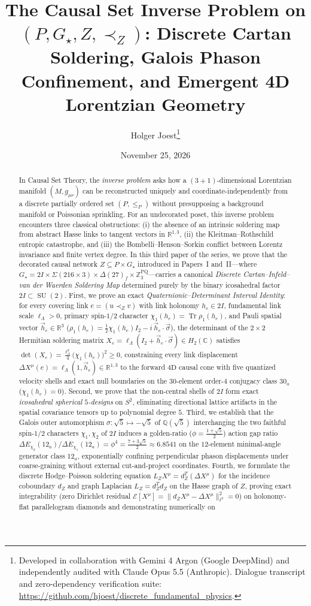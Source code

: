 \documentclass[11pt,a4paper]{article}
\title{\textbf{The Causal Set Inverse Problem on $(P, G_\star, Z, \prec_Z)$: Discrete Cartan Soldering, Galois Phason Confinement, and Emergent 4D Lorentzian Geometry}}
\author{Holger Joest\thanks{Developed in collaboration with Gemini 4 Argon (Google DeepMind) and independently audited with Claude Opus 5.5 (Anthropic). Dialogue transcript and zero-dependency verification suite: \url{https://github.com/hjoest/discrete_fundamental_physics}.}}
\date{November 25, 2026}
\theoremstyle{definition}
\theoremstyle{remark}
\newcommand{\R}{\mathbb{R}}
\newcommand{\C}{\mathbb{C}}
\newcommand{\Z}{\mathbb{Z}}
\newcommand{\Q}{\mathbb{Q}}
\newcommand{\Tr}{\operatorname{Tr}}
\newcommand{\SU}{\operatorname{SU}}
\newcommand{\Gstar}{G_\star}
\begin{document}
\maketitle

\begin{abstract}
In Causal Set Theory, the \emph{inverse problem} asks how a $(3+1)$-dimensional Lorentzian manifold $(M, g_{\mu\nu})$ can be reconstructed uniquely and coordinate-independently from a discrete partially ordered set $(P, \le_P)$ without presupposing a background manifold or Poissonian sprinkling. For an undecorated poset, this inverse problem encounters three classical obstructions: (i) the absence of an intrinsic soldering map from abstract Hasse links to tangent vectors in $\R^{1,3}$, (ii) the Kleitman--Rothschild entropic catastrophe, and (iii) the Bombelli--Henson--Sorkin conflict between Lorentz invariance and finite vertex degree. In this third paper of the series, we prove that the decorated causal network $Z \subseteq P \times \Gstar$ introduced in Papers~I and~II---where $\Gstar = 2I \times \Sigma(216 \times 3) \times \Delta(27)_f \times \Z_3^{\mathrm{PQ}}$---carries a canonical \emph{Discrete Cartan--Infeld--van der Waerden Soldering Map} determined purely by the binary icosahedral factor $2I \subset \SU(2)$. First, we prove an exact \emph{Quaternionic--Determinant Interval Identity}: for every covering link $e = (u \prec_Z v)$ with link holonomy $h_e \in 2I$, fundamental link scale $\ell_\Lambda > 0$, primary spin-$1/2$ character $\chi_1(h_e) = \Tr\rho_1(h_e)$, and Pauli spatial vector $\vec{h}_e \in \R^3$ ($\rho_1(h_e) = \frac{1}{2}\chi_1(h_e)I_2 - i\,\vec{h}_e\cdot\vec{\sigma}$), the determinant of the $2 \times 2$ Hermitian soldering matrix $X_e = \ell_\Lambda(I_2 + \vec{h}_e\cdot\vec{\sigma}) \in H_2(\C)$ satisfies $\det(X_e) = \frac{\ell_\Lambda^2}{4}\bigl(\chi_1(h_e)\bigr)^2 \ge 0$, constraining every link displacement $\Delta X^\mu(e) = \ell_\Lambda(1, \vec{h}_e) \in \R^{1,3}$ to the forward $4\text{D}$ causal cone with five quantized velocity shells and exact null boundaries on the $30$-element order-$4$ conjugacy class $30_a$ ($\chi_1(h_e) = 0$). Second, we prove that the non-central shells of $2I$ form exact \emph{icosahedral spherical $5$-designs} on $S^2$, eliminating directional lattice artifacts in the spatial covariance tensors up to polynomial degree $5$. Third, we establish that the Galois outer automorphism $\sigma : \sqrt{5} \mapsto -\sqrt{5}$ of $\Q(\sqrt{5})$ interchanging the two faithful spin-$1/2$ characters $\chi_1, \chi_2$ of $2I$ induces a golden-ratio ($\phi = \frac{1+\sqrt{5}}{2}$) action gap ratio $\Delta E_{\chi_2}(12_a)/\Delta E_{\chi_1}(12_a) = \phi^4 = \frac{7+3\sqrt{5}}{2} \approx 6.8541$ on the $12$-element minimal-angle generator class $12_a$, exponentially confining perpendicular phason displacements under coarse-graining without external cut-and-project coordinates. Fourth, we formulate the discrete Hodge--Poisson soldering equation $L_Z X^\mu = d_Z^T(\Delta X^\mu)$ for the incidence coboundary $d_Z$ and graph Laplacian $L_Z = d_Z^T d_Z$ on the Hasse graph of $Z$, proving exact integrability (zero Dirichlet residual $\mathcal{E}[X^\mu] = \|d_Z X^\mu - \Delta X^\mu\|_{\ell^2}^2 = 0$) on holonomy-flat parallelogram diamonds and demonstrating numerically on 
\end{abstract}
\end{document}
